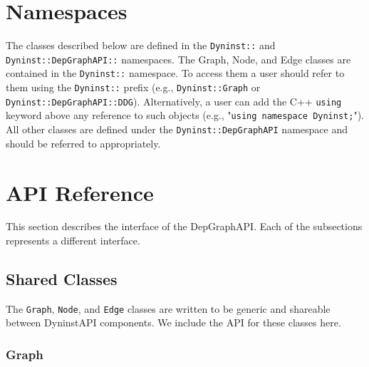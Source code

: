 \documentclass[12pt,titlepage]{article}
\begin{document}
\section{Namespaces}

The classes described below are defined in the \texttt{Dyninst::} and
\texttt{Dyninst::DepGraphAPI::} namespaces. The Graph, Node, and Edge
classes are contained in the \texttt{Dyninst::} namespace.  To access
them a user should refer to them using the \texttt{Dyninst::} prefix
(e.g., \texttt{Dyninst::Graph} or
\texttt{Dyninst::DepGraphAPI::DDG}). Alternatively, a user can add the
C++ \texttt{using} keyword above any reference to such objects (e.g.,
"\texttt{using namespace Dyninst;}"). All other classes are defined
under the \texttt{Dyninst::DepGraphAPI} namespace and should be
referred to appropriately.

\section{API Reference}

This section describes the interface of the DepGraphAPI. Each of the
subsections represents a different interface.
        
\subsection{Shared Classes}

The \texttt{Graph}, \texttt{Node}, and \texttt{Edge} classes are written to be generic and
shareable between DyninstAPI components. We include the API for these
classes here.

\subsubsection{Graph}
\end{document}
